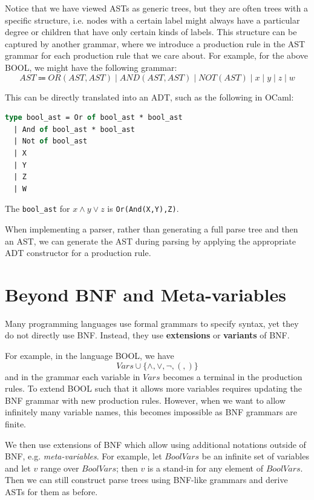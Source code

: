 Notice that we have viewed ASTs as generic trees, but they are often trees with a specific structure, i.e. nodes with a certain label might always have a particular degree or children that have only certain kinds of labels. This structure can be captured by another grammar, where we introduce a production rule in the AST grammar for each production rule that we care about. For example, for the above BOOL, we might have the following grammar:
\[
  AST \Coloneqq OR(AST, AST) \mid AND(AST, AST) \mid NOT(AST) \mid x \mid y \mid z \mid w
\]

This can be directly translated into an ADT, such as the following in OCaml:

\begin{lstlisting}[language=OCaml]
type bool_ast = Or of bool_ast * bool_ast
  | And of bool_ast * bool_ast
  | Not of bool_ast
  | X
  | Y
  | Z
  | W
\end{lstlisting}

The \texttt{bool\_ast} for \(x \wedge y \vee z\) is \texttt{Or(And(X,Y),Z)}.

When implementing a parser, rather than generating a full parse tree and then an AST, we can generate the AST during parsing by applying the appropriate ADT constructor for a production rule. 

\section{Beyond BNF and Meta-variables}
Many programming languages use formal grammars to specify syntax, yet they do not directly use BNF. Instead, they use \textbf{extensions} or \textbf{variants} of BNF. 

For example, in the language BOOL, we have 
\[
  Vars \cup \{\wedge, \vee, \neg, (,)\}
\]
and in the grammar each variable in \(Vars\) becomes a terminal in the production rules. To extend BOOL such that it allows more variables requires updating the BNF grammar with new production rules. However, when we want to allow infinitely many variable names, this becomes impossible as BNF grammars are finite. 

We then use extensions of BNF which allow using additional notations outside of BNF, e.g. \textit{meta-variables}. For example, let \(BoolVars\) be an infinite set of variables and let \(v\) range over \(BoolVars\); then \(v\) is a stand-in for any element of \(BoolVars\). Then we can still construct parse trees using BNF-like grammars and derive ASTs for them as before. 

